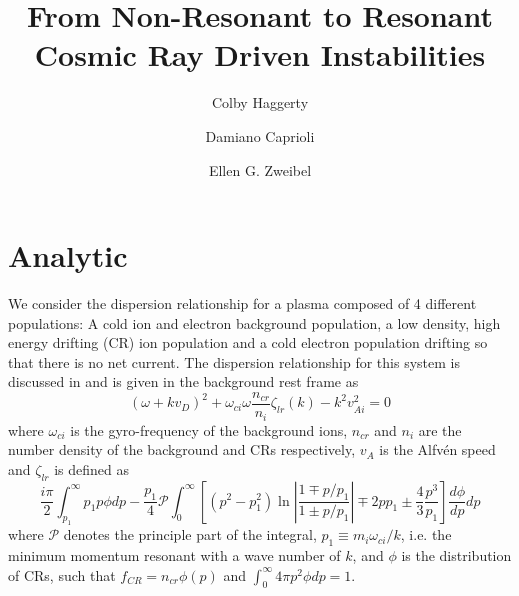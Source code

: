\documentclass[twocolumn]{aastex631}
\begin{document}
\title{From Non-Resonant to Resonant Cosmic Ray Driven Instabilities}

\author[0000-0002-2160-7288]{Colby Haggerty}

\author[0000-0003-0939-8775]{Damiano Caprioli}

\author{Ellen G. Zweibel}


\begin{abstract}
    \blindtext
\end{abstract}

\section{Analytic} \label{sec:analytic}
We consider the dispersion relationship for a plasma composed of 4 different populations: A cold  ion and electron background population, a low density, high energy drifting (CR) ion population and a cold electron population drifting so that there is no net current. The dispersion relationship for this system is discussed in \cite{zweibel03} and is given in the background rest frame as
\begin{equation}
    (\omega + kv_D)^2 + \omega_{ci}\omega\frac{n_{cr}}{n_i}\zeta_{lr}(k) - k^2v_{Ai}^2 = 0
\end{equation}
where $\omega_{ci}$ is the gyro-frequency of the background ions, $n_{cr}$ and $n_i$ are the number density of the background and CRs respectively, $v_{A}$ is the Alfv\'en speed and $\zeta_{lr}$ is defined as
\begin{equation}
    \frac{i\pi}{2}\int_{p_1}^\infty p_1p\phi dp -
    \frac{p_1}{4}\mathscr{P} \int_{0}^\infty  \left [ 
    (p^2 - p_1^2)\ln \left | \frac{1 \mp p/p_1}{1 \pm p/p_1} \right | \mp 2pp_1 \pm \frac{4}{3}
    \frac{p^3}{p_1}
    \right ] \frac{d\phi}{dp} dp
\end{equation}
where $\mathscr{P}$ denotes the principle part of the integral, $p_1 \equiv m_i \omega_{ci}/k$, i.e. the minimum momentum resonant with a wave number of $k$, and $\phi$ is the distribution of CRs, such that $f_{CR} = n_{cr}\phi(p)$ and $\int_0^\infty 4\pi p^2 \phi dp = 1$.  
\end{document}

